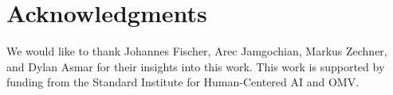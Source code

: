\section*{Acknowledgments}
We would like to thank Johannes Fischer, Arec Jamgochian, Markus Zechner, and Dylan Asmar for their insights into this work.
This work is supported by funding from the Standard Institute for Human-Centered AI and OMV.
